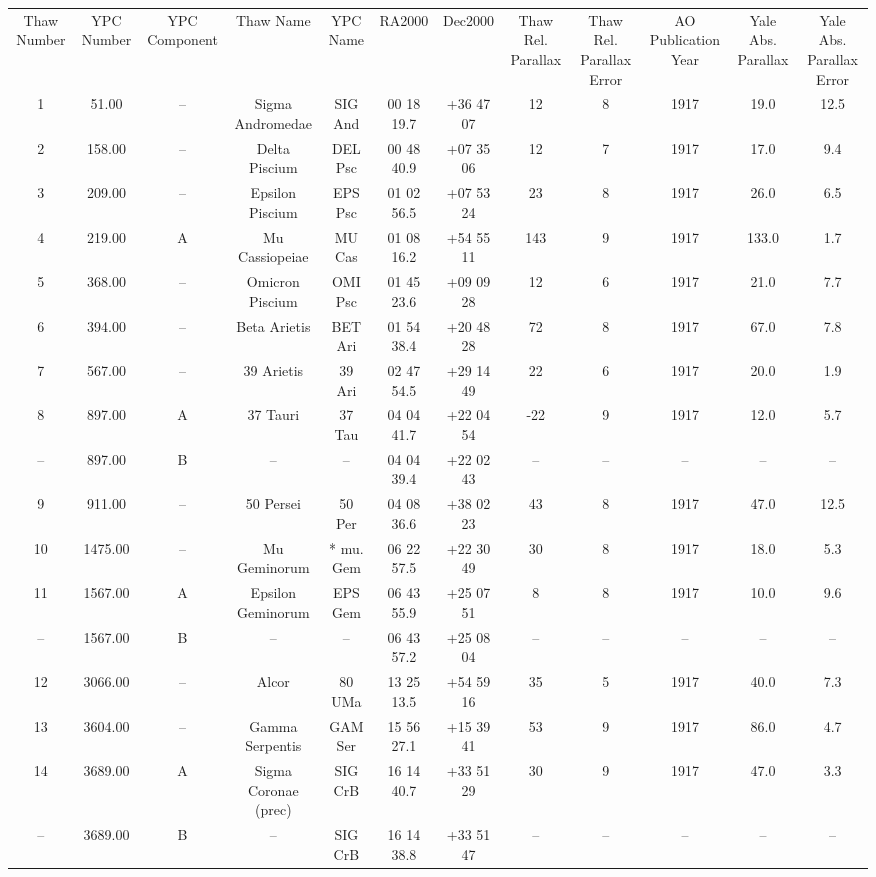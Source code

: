 \begin{table}
\begin{tabular}{cccccccccccc}
Thaw Number & YPC Number & YPC Component & Thaw Name & YPC Name & RA2000 & Dec2000 & Thaw Rel. Parallax & Thaw Rel. Parallax Error & AO Publication Year & Yale Abs. Parallax & Yale Abs. Parallax Error \\
1 & 51.00 & -- & Sigma Andromedae & SIG And & 00 18 19.7 & +36 47 07 & 12 & 8 & 1917 & 19.0 & 12.5 \\
2 & 158.00 & -- & Delta Piscium & DEL Psc & 00 48 40.9 & +07 35 06 & 12 & 7 & 1917 & 17.0 & 9.4 \\
3 & 209.00 & -- & Epsilon Piscium & EPS Psc & 01 02 56.5 & +07 53 24 & 23 & 8 & 1917 & 26.0 & 6.5 \\
4 & 219.00 & A & Mu Cassiopeiae & MU Cas & 01 08 16.2 & +54 55 11 & 143 & 9 & 1917 & 133.0 & 1.7 \\
5 & 368.00 & -- & Omicron  Piscium & OMI Psc & 01 45 23.6 & +09 09 28 & 12 & 6 & 1917 & 21.0 & 7.7 \\
6 & 394.00 & -- & Beta Arietis & BET Ari & 01 54 38.4 & +20 48 28 & 72 & 8 & 1917 & 67.0 & 7.8 \\
7 & 567.00 & -- & 39 Arietis & 39 Ari & 02 47 54.5 & +29 14 49 & 22 & 6 & 1917 & 20.0 & 1.9 \\
8 & 897.00 & A & 37 Tauri & 37 Tau & 04 04 41.7 & +22 04 54 & -22 & 9 & 1917 & 12.0 & 5.7 \\
-- & 897.00 & B & -- & -- & 04 04 39.4 & +22 02 43 & -- & -- & -- & -- & -- \\
9 & 911.00 & -- & 50 Persei & 50 Per & 04 08 36.6 & +38 02 23 & 43 & 8 & 1917 & 47.0 & 12.5 \\
10 & 1475.00 & -- & Mu Geminorum & * mu. Gem & 06 22 57.5 & +22 30 49 & 30 & 8 & 1917 & 18.0 & 5.3 \\
11 & 1567.00 & A & Epsilon Geminorum & EPS Gem & 06 43 55.9 & +25 07 51 & 8 & 8 & 1917 & 10.0 & 9.6 \\
-- & 1567.00 & B & -- & -- & 06 43 57.2 & +25 08 04 & -- & -- & -- & -- & -- \\
12 & 3066.00 & -- & Alcor & 80 UMa & 13 25 13.5 & +54 59 16 & 35 & 5 & 1917 & 40.0 & 7.3 \\
13 & 3604.00 & -- & Gamma Serpentis & GAM Ser & 15 56 27.1 & +15 39 41 & 53 & 9 & 1917 & 86.0 & 4.7 \\
14 & 3689.00 & A & Sigma Coronae (prec) & SIG CrB & 16 14 40.7 & +33 51 29 & 30 & 9 & 1917 & 47.0 & 3.3 \\
-- & 3689.00 & B & -- & SIG CrB & 16 14 38.8 & +33 51 47 & -- & -- & -- & -- & -- \\

\end{tabular}
\end{table}

